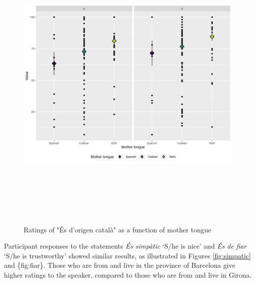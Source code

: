 \documentclass[
  a4paper,
  11pt,
  twocolumn]{article}
\begin{document}
\begin{figure}[!ht]
\begin{center}
\includegraphics[height=15cm]{./includes/figures/oc.png}
\caption{Ratings of "És d'origen català" as a function of mother tongue}\label{fig:oc}
\end{center}
\end{figure}

Participant responses to the statements \emph{És simpàtic} `S/he is
nice' and \emph{És de fiar} `S/he is trustworthy' showed similar
results, as illustrated in Figures \ref{fig:simpatic} and \{fig:fiar\}.
Those who are from and live in the province of Barcelona give higher
ratings to the speaker, compared to those who are from and live in
Girona.
\end{document}
